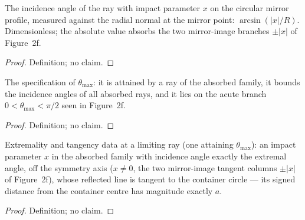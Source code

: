 \begin{definition}
\label{def:IPhO2026Problems_problem_IPhO_2026_2_B_1:incidenceAngle}
The incidence angle of the ray with impact parameter $x$ on the circular
mirror profile, measured against the radial normal at the mirror point:
$\arcsin(|x| / R)$.  Dimensionless; the absolute value absorbs the two
mirror-image branches $\pm|x|$ of Figure~2f.
\end{definition}
\begin{proof}
Definition; no claim.
\end{proof}

\begin{definition}
\label{def:IPhO2026Problems_problem_IPhO_2026_2_B_1:IsThetaMax}
The specification of $\theta_{\max}$: it is attained by a ray of the
absorbed family, it bounds the incidence angles of all absorbed rays, and
it lies on the acute branch $0 < \theta_{\max} < \pi/2$ seen in Figure~2f.
\end{definition}
\begin{proof}
Definition; no claim.
\end{proof}

\begin{definition}
\label{def:IPhO2026Problems_problem_IPhO_2026_2_B_1:ExtremalRaySpec}
Extremality and tangency data at a limiting ray (one attaining
$\theta_{\max}$): an impact parameter $x$ in the absorbed family with
incidence angle exactly the extremal angle, off the symmetry axis
($x \neq 0$, the two mirror-image tangent columns $\pm|x|$ of Figure~2f),
whose reflected line is tangent to the container circle --- its signed
distance from the container centre has magnitude exactly $a$.
\end{definition}
\begin{proof}
Definition; no claim.
\end{proof}

